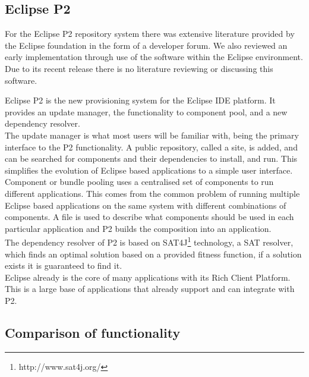 \subsection{Eclipse P2}

For the Eclipse P2 repository system there was extensive literature provided by the Eclipse foundation in the form of a developer forum.
We also reviewed an early implementation through use of the software within the Eclipse environment.
Due to its recent release there is no literature reviewing or discussing this software.

Eclipse P2
is the new provisioning system for the Eclipse IDE platform.
It provides an update manager, the functionality to component pool, and a new dependency resolver.\\
The update manager is what most users will be familiar with, being the primary interface to the P2 functionality. 
A public repository, called a site, is added, and can be searched for components and their dependencies to install, and run.
This simplifies the evolution of Eclipse based applications to a simple user interface.\\
Component or bundle pooling uses a centralised set of components to run different applications.
This comes from the common problem of running multiple Eclipse based applications on the same system with different combinations of components.
A file is used to describe what components should be used in each particular application and P2 builds the composition into an application.\\
The dependency resolver of P2 is based on SAT4J\footnote{http://www.sat4j.org/} technology, a SAT resolver, which finds an optimal solution based on
a provided fitness function, if a solution exists it is guaranteed to find it.\\  
Eclipse already is
the core of many applications with its Rich Client Platform. This is a large base of applications that already support and can integrate with P2.


\subsection{Comparison of functionality}



